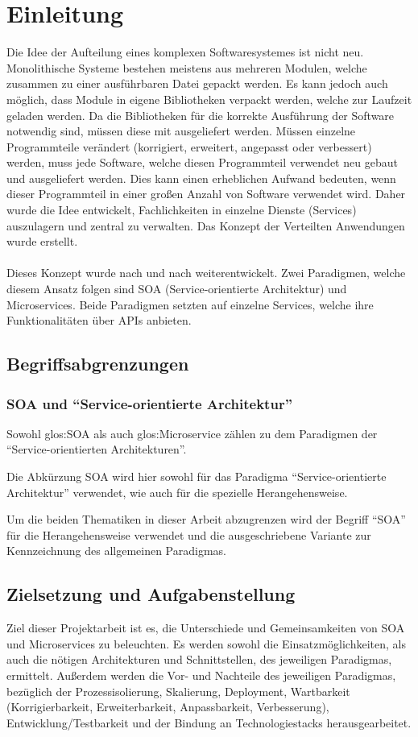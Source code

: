 \chapter{Einleitung}
\label{chap:Einleitung}
Die Idee der Aufteilung eines komplexen Softwaresystemes ist nicht neu. Monolithische Systeme bestehen meistens aus mehreren Modulen, welche zusammen zu einer ausführbaren Datei gepackt werden. Es kann jedoch auch möglich, dass Module in eigene Bibliotheken verpackt werden, welche zur Laufzeit geladen werden. Da die Bibliotheken für die korrekte Ausführung der Software notwendig sind, müssen diese mit ausgeliefert werden. Müssen einzelne Programmteile verändert (korrigiert, erweitert, angepasst oder verbessert) werden, muss jede Software, welche diesen Programmteil verwendet neu gebaut und ausgeliefert werden. Dies kann einen erheblichen Aufwand bedeuten, wenn dieser Programmteil in einer großen Anzahl von Software verwendet wird. Daher wurde die Idee entwickelt, Fachlichkeiten in einzelne Dienste (Services) auszulagern und zentral zu verwalten. Das Konzept der Verteilten Anwendungen wurde erstellt.
\\\\
Dieses Konzept wurde nach und nach weiterentwickelt. Zwei Paradigmen, welche diesem Ansatz folgen sind SOA (Service-orientierte Architektur) und Microservices. Beide Paradigmen setzten auf einzelne Services, welche ihre Funktionalitäten über APIs anbieten.

\section{Begriffsabgrenzungen}
\label{sec:Begriffsabgrenzungen}

\subsection*{SOA und "`Service-orientierte Architektur"'}
Sowohl \gls{glos:SOA} als auch \gls{glos:Microservice} zählen zu dem Paradigmen der "`Service-orientierten Architekturen"'.

Die Abkürzung SOA wird hier sowohl für das Paradigma "`Service-orientierte Architektur"' verwendet, wie auch für die spezielle Herangehensweise.

Um die beiden Thematiken in dieser Arbeit abzugrenzen wird der Begriff "`SOA"' für die Herangehensweise verwendet und die ausgeschriebene Variante zur Kennzeichnung des allgemeinen Paradigmas.

\section{Zielsetzung und Aufgabenstellung}
\label{sec:ZielsetzungUndAufgabenstellung}
Ziel dieser Projektarbeit ist es, die Unterschiede und Gemeinsamkeiten von SOA und Microservices zu beleuchten. Es werden sowohl die Einsatzmöglichkeiten, als auch die nötigen Architekturen und Schnittstellen, des jeweiligen Paradigmas, ermittelt. Außerdem werden die Vor- und Nachteile des jeweiligen Paradigmas, bezüglich der Prozessisolierung, Skalierung, Deployment, Wartbarkeit (Korrigierbarkeit, Erweiterbarkeit, Anpassbarkeit, Verbesserung), Entwicklung/Testbarkeit und der Bindung an Technologiestacks herausgearbeitet. 

